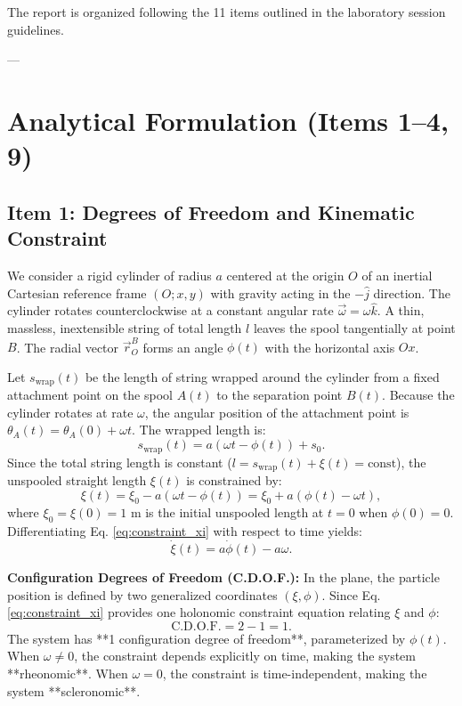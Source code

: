 \documentclass[11pt,a4paper]{article}
\begin{document}
The report is organized following the 11 items outlined in the laboratory session guidelines.

---

\section{Analytical Formulation (Items 1--4, 9)}
\label{sec:methodology}

\subsection{Item 1: Degrees of Freedom and Kinematic Constraint}
We consider a rigid cylinder of radius $a$ centered at the origin $O$ of an inertial Cartesian reference frame $(O; x, y)$ with gravity acting in the $-\hat{j}$ direction. The cylinder rotates counterclockwise at a constant angular rate $\vec{\omega} = \omega\hat{k}$. A thin, massless, inextensible string of total length $l$ leaves the spool tangentially at point $B$. The radial vector $\vec{r}_O^B$ forms an angle $\phi(t)$ with the horizontal axis $Ox$.

Let $s_{\text{wrap}}(t)$ be the length of string wrapped around the cylinder from a fixed attachment point on the spool $A(t)$ to the separation point $B(t)$. Because the cylinder rotates at rate $\omega$, the angular position of the attachment point is $\theta_A(t) = \theta_A(0) + \omega t$. The wrapped length is:
\begin{equation}
    s_{\text{wrap}}(t) = a\left(\omega t - \phi(t)\right) + s_0.
\end{equation}
Since the total string length is constant ($l = s_{\text{wrap}}(t) + \xi(t) = \text{const}$), the unspooled straight length $\xi(t)$ is constrained by:
\begin{equation}
    \label{eq:constraint_xi}
    \xi(t) = \xi_0 - a\left(\omega t - \phi(t)\right) = \xi_0 + a\left(\phi(t) - \omega t\right),
\end{equation}
where $\xi_0 = \xi(0) = 1\text{ m}$ is the initial unspooled length at $t = 0$ when $\phi(0) = 0$. Differentiating Eq. \eqref{eq:constraint_xi} with respect to time yields:
\begin{equation}
    \label{eq:xi_dot}
    \dot{\xi}(t) = a\dot{\phi}(t) - a\omega.
\end{equation}

\noindent\textbf{Configuration Degrees of Freedom (C.D.O.F.):} In the plane, the particle position is defined by two generalized coordinates $(\xi, \phi)$. Since Eq. \eqref{eq:constraint_xi} provides one holonomic constraint equation relating $\xi$ and $\phi$:
\begin{equation}
    \text{C.D.O.F.} = 2 - 1 = 1.
\end{equation}
The system has **1 configuration degree of freedom**, parameterized by $\phi(t)$. When $\omega \neq 0$, the constraint depends explicitly on time, making the system **rheonomic**. When $\omega = 0$, the constraint is time-independent, making the system **scleronomic**.
\end{document}
